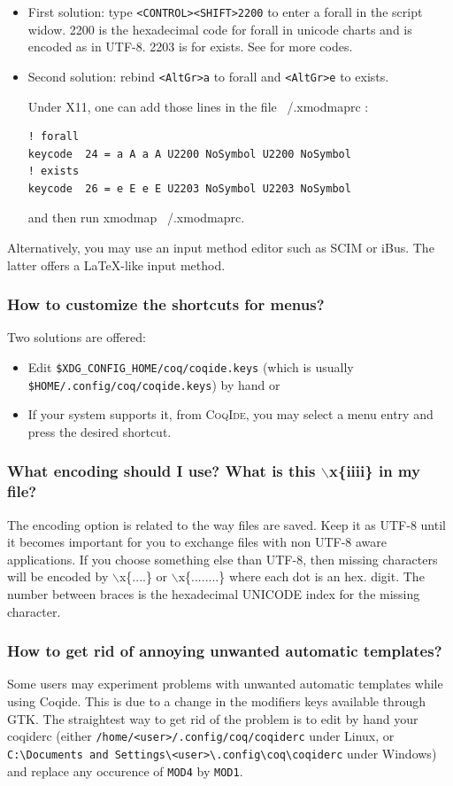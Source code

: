 \documentclass[a4paper,pdftex]{article}
\def\Question#1{\stepcounter{question}\subsubsection{#1}}
\def\CoqIde{\textsc{CoqIde}}
\begin{document}
\begin{itemize}
\item First solution: type \verb#<CONTROL><SHIFT>2200# to enter a forall in the script widow. 
	2200 is the hexadecimal code for forall in unicode charts and is encoded as 	
	in UTF-8.
	2203 is for exists. See  for more codes.
\item Second solution: rebind \verb#<AltGr>a# to forall and \verb#<AltGr>e# to exists.

       Under X11, one can add those lines in the file ~/.xmodmaprc :

\begin{verbatim}
! forall
keycode  24 = a A a A U2200 NoSymbol U2200 NoSymbol
! exists
keycode  26 = e E e E U2203 NoSymbol U2203 NoSymbol
\end{verbatim}
and then run xmodmap ~/.xmodmaprc.
\end{itemize}

	Alternatively, you may use an input method editor such as SCIM or iBus.
The latter offers a \LaTeX-like input method.

\Question{How to customize the shortcuts for menus?}
 Two solutions are offered:
\begin{itemize}
\item Edit \verb+$XDG_CONFIG_HOME/coq/coqide.keys+ (which is usually \verb+$HOME/.config/coq/coqide.keys+) by hand or
\item If your system supports it, from \CoqIde, you may select a menu entry and press the desired 
    shortcut. 
\end{itemize}

\Question{What encoding should I use? What is this $\backslash$x\{iiii\} in my file?}
 The encoding option is related to the way files are saved. 
 Keep it as UTF-8 until it becomes important for you to exchange files 
 with non UTF-8 aware applications.
 If you choose something else than UTF-8, then missing characters will 
 be encoded by $\backslash$x\{....\} or $\backslash$x\{........\}
 where each dot is an hex. digit. 
 The number between braces is the hexadecimal UNICODE index for the
  missing character.
    
\Question{How to get rid of annoying unwanted automatic templates?}

Some users may experiment problems with unwanted automatic
templates while using Coqide. This is due to a change in the
modifiers keys available through GTK. The straightest way to get
rid of the problem is to edit by hand your coqiderc (either
\verb|/home/<user>/.config/coq/coqiderc| under Linux, or \\
\verb|C:\Documents and Settings\<user>\.config\coq\coqiderc| under Windows) 
    and replace any occurence of \texttt{MOD4} by \texttt{MOD1}.
\end{document}
